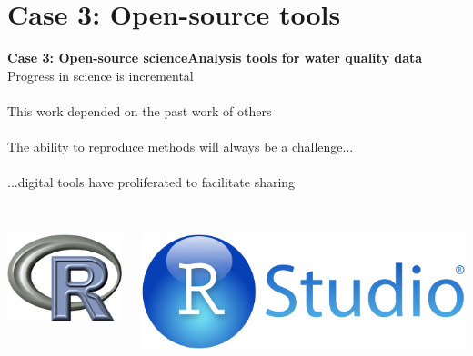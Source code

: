 \documentclass[serif]{beamer}\usepackage[]{graphicx}\usepackage[]{color}
\begin{document}
\section{Case 3: Open-source tools}
\begin{frame}{\textbf{Case 3: Open-source science}}{\textbf{Analysis tools for water quality data}}
\onslide<+->
Progress in science is incremental\\~\\
This work depended on the past work of others\\~\\
The ability to reproduce methods will always be a challenge...\\~\\
\onslide<+->
...digital tools have proliferated to \alert{facilitate sharing}\\~\\
\begin{columns}
\begin{column}{0.25\textwidth}
\centerline{\includegraphics[width = \textwidth]{fig/Rlogo.png}}
\end{column}
\begin{column}{0.25\textwidth}
\centerline{\includegraphics[width = \textwidth]{fig/RStudio.png}}

\end{column}
\end{columns}
\end{frame}
\end{document}
